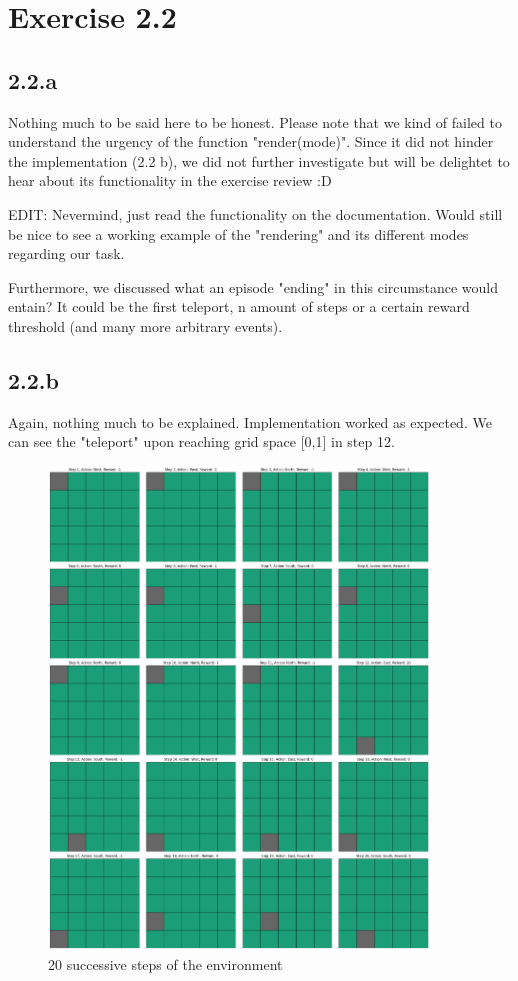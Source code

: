 \documentclass{article} %
\begin{document}
	
	
	
	\section{Exercise 2.2}
	\subsection{2.2.a}
	Nothing much to be said here to be honest. Please note that we kind of failed to understand the urgency of the function "render(mode)". Since it did not hinder the implementation (2.2 b), we did not further investigate but will be delightet to hear about its functionality in the exercise review :D 
	
	EDIT: Nevermind, just read the functionality on the documentation. Would still be nice to see a working example of the "rendering" and its different modes regarding our task.
	
	Furthermore, we discussed what an episode "ending" in this circumstance would entain? It could be the first teleport, n amount of steps or a certain reward threshold (and many more arbitrary events).
	
	\subsection{2.2.b}
	Again, nothing much to be explained. Implementation worked as expected. We can see the "teleport" upon reaching grid space [0,1] in step 12. 
	
	\begin{figure}[h!]
		\centering
		\includegraphics[width=0.9\textwidth]{images/20_steps.png}
		\caption{20 successive steps of the environment}
		\label{fig:1.1.a.1}
	\end{figure}
	
\end{document}
